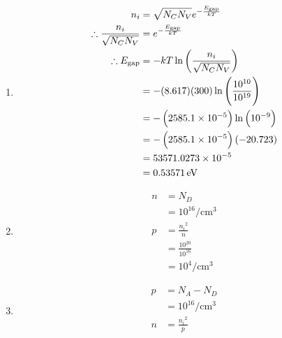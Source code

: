 \documentclass[fleqn, a4paper, 11pt, oneside]{amsart}
\theoremstyle{definition}
\theoremstyle{theorem}
\begin{document}
\begin{solution}
	\begin{enumerate}[leftmargin=*]
		\item
			\begin{align*}
				n_i                                   & = \sqrt{N_C N_V} e^{-\frac{E_{\text{gap}}}{k T}}                  \\
				\therefore \frac{n_i}{\sqrt{N_C N_V}} & = e^{-\frac{E_{\text{gap}}}{k T}}                                 \\
				\therefore E_{\text{gap}}             & = -k T \ln\left( \frac{n_i}{\sqrt{N_C N_V}} \right)               \\
                                                                      & = -(8.617) (300) \ln\left( \frac{10^{10}}{10^{19}} \right)        \\
                                                                      & = -\left( 2585.1 \times 10^{-5} \right) \ln\left( 10^{-9} \right) \\
                                                                      & = -\left( 2585.1 \times 10^{-5} \right) (-20.723)                 \\
                                                                      & = 53571.0273 \times 10^{-5}                                       \\
                                                                      & = 0.53571 \electronvolt
			\end{align*}
		\item
			\begin{align*}
				n & = N_D                                 \\
                                  & = 10^{16} \si{\per\centi\metre\cubed} \\
				p & = \frac{{n_i}^2}{n}                   \\
                                  & = \frac{10^{20}}{10^{16}}             \\
                                  & = 10^4 \si{\per\centi\metre\cubed}
			\end{align*}
		\item
			\begin{align*}
				p & = N_A - N_D                           \\
                                  & = 10^{16} \si{\per\centi\metre\cubed} \\
				n & = \frac{{n_i}^2}{p}                   \\

\end{align*}
\end{enumerate}
\end{solution}
\end{document}
